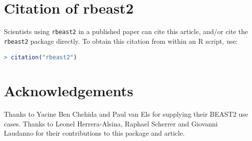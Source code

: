 \documentclass{article}
\begin{document}
\section{Citation of rbeast2}

Scientists using \verb;rbeast2; in a published paper can cite this
article, and/or cite the \verb;rbeast2; package 
directly. To obtain this citation from within an R script, use:

\begin{lstlisting}[language=R]
> citation("rbeast2")
\end{lstlisting}

\section{Acknowledgements}

Thanks to Yacine Ben Chehida and Paul van Els for supplying their 
BEAST2 use cases. Thanks to Leonel Herrera-Alsina, Raphael Scherrer 
and Giovanni Laudanno for their contributions to this package and article.
\end{document}
